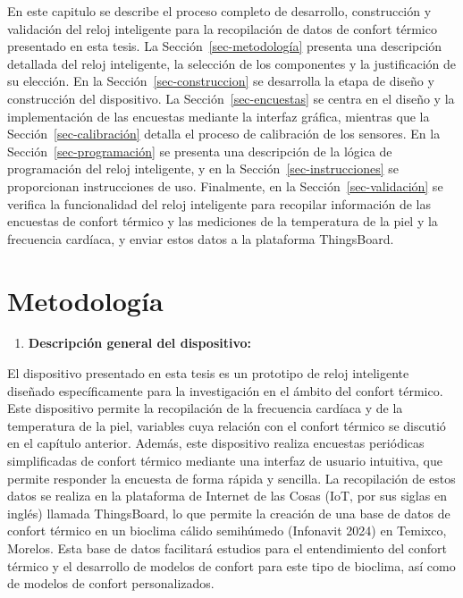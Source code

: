 \documentclass[
  12pt,
  letterpaper,
  DIV=11,
  numbers=noendperiod]{scrreport}
\providecommand{\tightlist}{%
  \setlength{\itemsep}{0pt}\setlength{\parskip}{0pt}}\usepackage{longtable,booktabs,array}
\begin{document}
En este capitulo se describe el proceso completo de desarrollo,
construcción y validación del reloj inteligente para la recopilación de
datos de confort térmico presentado en esta tesis. La
Sección~\ref{sec-metodología} presenta una descripción detallada del
reloj inteligente, la selección de los componentes y la justificación de
su elección. En la Sección~\ref{sec-construccion} se desarrolla la etapa
de diseño y construcción del dispositivo. La Sección~\ref{sec-encuestas}
se centra en el diseño y la implementación de las encuestas mediante la
interfaz gráfica, mientras que la Sección~\ref{sec-calibración} detalla
el proceso de calibración de los sensores. En la
Sección~\ref{sec-programación} se presenta una descripción de la lógica
de programación del reloj inteligente, y en la
Sección~\ref{sec-instrucciones} se proporcionan instrucciones de uso.
Finalmente, en la Sección~\ref{sec-validación} se verifica la
funcionalidad del reloj inteligente para recopilar información de las
encuestas de confort térmico y las mediciones de la temperatura de la
piel y la frecuencia cardíaca, y enviar estos datos a la plataforma
ThingsBoard.

\hypertarget{sec-metodologuxeda}{%
\section{Metodología}\label{sec-metodologuxeda}}

\begin{enumerate}
\def\labelenumi{\arabic{enumi}.}
\tightlist
\item
  \textbf{Descripción general del dispositivo:}
\end{enumerate}

El dispositivo presentado en esta tesis es un prototipo de reloj
inteligente diseñado específicamente para la investigación en el ámbito
del confort térmico. Este dispositivo permite la recopilación de la
frecuencia cardíaca y de la temperatura de la piel, variables cuya
relación con el confort térmico se discutió en el capítulo anterior.
Además, este dispositivo realiza encuestas periódicas simplificadas de
confort térmico mediante una interfaz de usuario intuitiva, que permite
responder la encuesta de forma rápida y sencilla. La recopilación de
estos datos se realiza en la plataforma de Internet de las Cosas (IoT,
por sus siglas en inglés) llamada ThingsBoard, lo que permite la
creación de una base de datos de confort térmico en un bioclima cálido
semihúmedo (Infonavit 2024) en Temixco, Morelos. Esta base de datos
facilitará estudios para el entendimiento del confort térmico y el
desarrollo de modelos de confort para este tipo de bioclima, así como de
modelos de confort personalizados.
\end{document}

